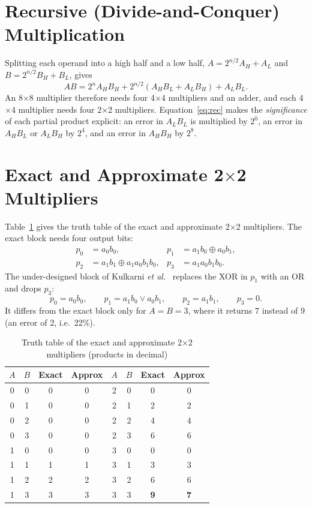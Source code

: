 \documentclass[12pt,a4paper,oneside]{report}
\begin{document}
\section{Recursive (Divide-and-Conquer) Multiplication}
Splitting each operand into a high half and a low half, $A=2^{n/2}A_H+A_L$ and $B=2^{n/2}B_H+B_L$, gives
\begin{equation}
AB = 2^{n}A_HB_H + 2^{n/2}(A_HB_L + A_LB_H) + A_LB_L .
\label{eq:rec}
\end{equation}
An 8$\times$8 multiplier therefore needs four 4$\times$4 multipliers and an adder, and each 4$\times$4 multiplier needs four 2$\times$2 multipliers. Equation~\eqref{eq:rec} makes the \emph{significance} of each partial product explicit: an error in $A_LB_L$ is multiplied by $2^0$, an error in $A_HB_L$ or $A_LB_H$ by $2^4$, and an error in $A_HB_H$ by $2^8$.

\section{Exact and Approximate 2$\times$2 Multipliers}
Table~\ref{tab:tt} gives the truth table of the exact and approximate 2$\times$2 multipliers. The exact block needs four output bits:
\begin{align}
p_0 &= a_0b_0, & p_1 &= a_1b_0 \oplus a_0b_1,\\
p_2 &= a_1b_1 \oplus a_1a_0b_1b_0, & p_3 &= a_1a_0b_1b_0 .
\end{align}
The under-designed block of Kulkarni \emph{et al.}~\cite{kulkarni2011udm} replaces the XOR in $p_1$ with an OR and drops $p_3$:
\begin{equation}
p_0 = a_0b_0,\qquad p_1 = a_1b_0 \lor a_0b_1,\qquad p_2 = a_1b_1,\qquad p_3 = 0 .
\end{equation}
It differs from the exact block only for $A=B=3$, where it returns $7$ instead of $9$ (an error of 2, i.e.\ 22\%).

\begin{table}[ht]
\centering
\caption{Truth table of the exact and approximate 2$\times$2 multipliers (products in decimal)}
\label{tab:tt}
\begin{tabular}{cccc|cccc}
\toprule
$A$ & $B$ & Exact & Approx & $A$ & $B$ & Exact & Approx \\
\midrule
0 & 0 & 0 & 0 & 2 & 0 & 0 & 0 \\
0 & 1 & 0 & 0 & 2 & 1 & 2 & 2 \\
0 & 2 & 0 & 0 & 2 & 2 & 4 & 4 \\
0 & 3 & 0 & 0 & 2 & 3 & 6 & 6 \\
1 & 0 & 0 & 0 & 3 & 0 & 0 & 0 \\
1 & 1 & 1 & 1 & 3 & 1 & 3 & 3 \\
1 & 2 & 2 & 2 & 3 & 2 & 6 & 6 \\
1 & 3 & 3 & 3 & 3 & 3 & \textbf{9} & \textbf{7} \\
\bottomrule
\end{tabular}
\end{table}
\end{document}
